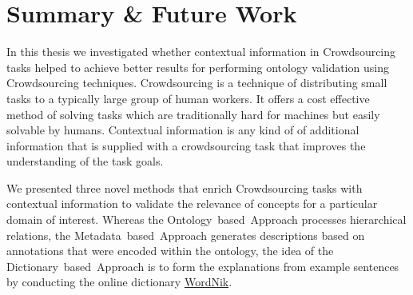 \chapter{Summary \& Future Work}\label{chap:summary_and_future_work}





In this thesis we investigated whether contextual information in Crowdsourcing tasks helped to achieve better results for performing ontology validation using Crowdsourcing techniques. Crowdsourcing is a technique of distributing small tasks to a typically large group of human workers. It offers a cost effective method of solving tasks which are traditionally hard for machines but easily solvable by humans. Contextual information is any kind of of additional information that is supplied with a crowdsourcing task that improves the understanding of the task goals.

We presented three novel methods that enrich Crowdsourcing tasks with contextual information to validate the relevance of concepts for a particular domain of interest. Whereas the Ontology~based~Approach processes hierarchical relations, the Metadata~based~Approach generates descriptions based on annotations that were encoded within the ontology, the idea of the Dictionary~based~Approach is to form the explanations from example sentences by conducting the online dictionary \hyperref[sec:wordnik]{WordNik}.

